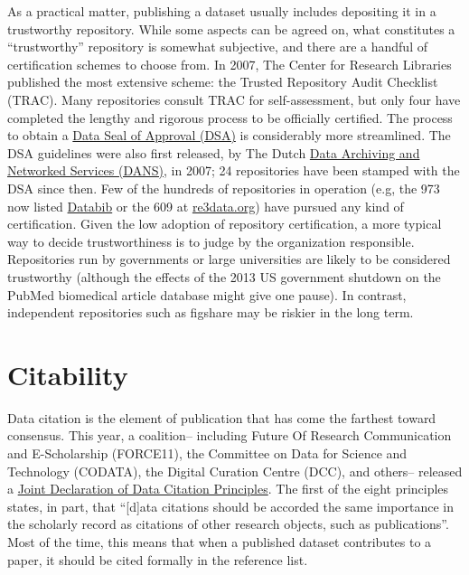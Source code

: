 \documentclass[10pt,twocolumn]{article}
\begin{document}
As a practical matter, publishing a dataset usually includes depositing it in a trustworthy repository.
While some aspects can be agreed on, what constitutes a ``trustworthy'' repository is somewhat subjective, and there are a handful of certification schemes to choose from.
In 2007, The Center for Research Libraries published the most extensive scheme: the Trusted Repository Audit Checklist (TRAC)\cite{dale_trustworthy_2007}.
Many repositories consult TRAC for self-assessment, but only four have completed the lengthy and rigorous process to be officially certified.
The process to obtain a \href{http://datasealofapproval.org/}{Data Seal of Approval (DSA)} is considerably more streamlined.
The DSA guidelines were also first released, by The Dutch \href{http://www.dans.knaw.nl/en}{Data Archiving and Networked Services (DANS)}, in 2007; 24 repositories have been stamped with the DSA since then.
Few of the hundreds of repositories in operation (e.g, the 973 now listed \href{http://databib.org/}{Databib} or the 609 at \href{http://www.re3data.org/}{re3data.org}) have pursued any kind of certification.
Given the low adoption of repository certification, a more typical way to decide trustworthiness is to judge by the organization responsible.
Repositories run by governments or large universities are likely to be considered trustworthy (although the effects of the 2013 US government shutdown on the PubMed biomedical article database\cite{check-hayden_nih_2013} might give one pause).
In contrast, independent repositories such as figshare may be riskier in the long term.

\section*{Citability}\label{citability}

Data citation is the element of publication that has come the farthest toward consensus.
This year, a coalition– including Future Of Research Communication and E-Scholarship (FORCE11)\cite{bourne_improving_2012}, the Committee on Data for Science and Technology (CODATA)\cite{codata-icsti_task_group_on_data_citation_standards_and_practices_out_2013}, the Digital Curation Centre (DCC), and others– released a \href{http://www.force11.org/datacitation}{Joint Declaration of Data Citation Principles}.
The first of the eight principles states, in part, that ``[d]ata citations should be accorded the same importance in the scholarly record as citations of other research objects, such as publications''.
Most of the time, this means that when a published dataset contributes to a paper, it should be cited formally in the reference list.
	
\end{document}

